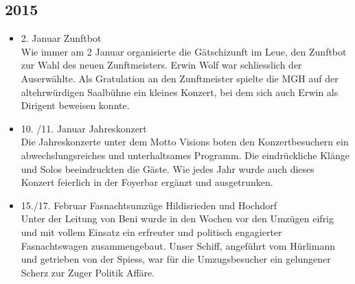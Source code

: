 \subsection*{2015}
\begin{history}


      \begin{itemize}

            \item 2. Januar Zunftbot\\
                  Wie immer am 2 Januar organisierte die Gätschizunft im Leue,
                  den Zunftbot zur Wahl des neuen Zunftmeisters. Erwin Wolf war
                  schliesslich der Auserwählte. Als Gratulation an den
                  Zunftmeister spielte die MGH auf der altehrwürdigen Saalbühne
                  ein kleines Konzert, bei dem sich auch Erwin als Dirigent
                  beweisen konnte.

            \item 10. /11. Januar Jahreskonzert\\
                  Die Jahreskonzerte unter dem Motto Visions boten den
                  Konzertbesuchern ein abwechslungsreiches und unterhaltsames
                  Programm. Die eindrückliche Klänge und Solos beeindruckten die
                  Gäste. Wie jedes Jahr wurde auch dieses Konzert feierlich in
                  der Foyerbar ergänzt und ausgetrunken.

            \item 15./17. Februar Fasnachtsumzüge Hildisrieden und Hochdorf\\
                  Unter der Leitung von Beni wurde in den Wochen vor den Umzügen
                  eifrig und mit vollem Einsatz ein erfreuter und politisch
                  engagierter Fasnachtswagen zusammengebaut. Unser Schiff,
                  angeführt vom Hürlimann und getrieben von der Spiess, war für
                  die Umzugsbesucher ein gelungener Scherz zur Zuger Politik
                  Affäre.


\end{itemize}
\end{history}
